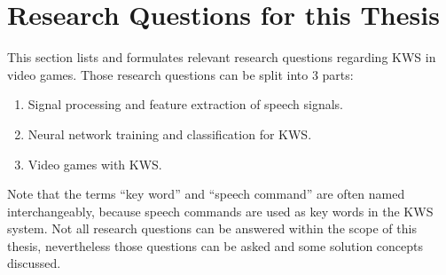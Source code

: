 
\section{Research Questions for this Thesis}\label{sec:intro_rq}
\thesisStateRevised
This section lists and formulates relevant research questions regarding KWS in video games.
Those research questions can be split into 3 parts:
\begin{enumerate}[label={Q.\arabic*)}, leftmargin=1.4cm]
  \item Signal processing and feature extraction of speech signals.
  \item Neural network training and classification for KWS.
  \item Video games with KWS.
\end{enumerate}
Note that the terms \enquote{key word} and \enquote{speech command} are often named interchangeably, because speech commands are used as key words in the KWS system.
Not all research questions can be answered within the scope of this thesis, nevertheless those questions can be asked and some solution concepts discussed.



